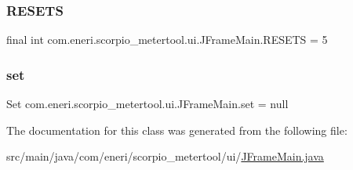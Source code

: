 \subsubsection{\texorpdfstring{R\+E\+S\+E\+TS}{RESETS}}
{\footnotesize\ttfamily final int com.\+eneri.\+scorpio\+\_\+metertool.\+ui.\+J\+Frame\+Main.\+R\+E\+S\+E\+TS = 5\hspace{0.3cm}{\ttfamily [static]}}

\mbox{\label{classcom_1_1eneri_1_1scorpio__metertool_1_1ui_1_1_j_frame_main_a8e77c20bb3e8db3cf5e7185f1d4c8107}} 
\subsubsection{\texorpdfstring{set}{set}}
{\footnotesize\ttfamily Set com.\+eneri.\+scorpio\+\_\+metertool.\+ui.\+J\+Frame\+Main.\+set = null\hspace{0.3cm}{\ttfamily [static]}}



The documentation for this class was generated from the following file\+:\begin{DoxyCompactItemize}
\item 
src/main/java/com/eneri/scorpio\+\_\+metertool/ui/\hyperlink{_j_frame_main_8java}{J\+Frame\+Main.\+java}\end{DoxyCompactItemize}
